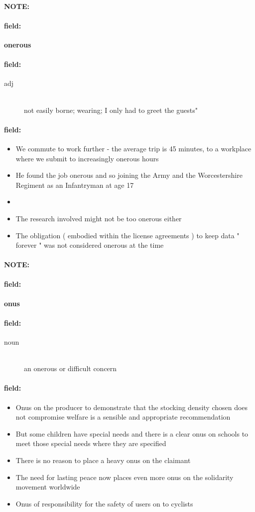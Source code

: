 \documentclass[12pt]{article}
\newenvironment{note}{\paragraph{NOTE:}}{}
\newenvironment{field}{\paragraph{field:}}{}
\begin{document}
\begin{note}
\begin{field}
\textbf{\large onerous}
\end{field}


\begin{field}
\begin{description}
\item[adj] \hfill \\ 
not easily borne; wearing; I only had to greet the guests"

\end{description}
\end{field}

\begin{field}
\begin{itemize}
\item We commute to work further - the average trip is 45 minutes, to a workplace where we submit to increasingly onerous hours
\item He found the job onerous and so joining the Army and the Worcestershire Regiment as an Infantryman at age 17
\item 
\item The research involved might not be too onerous either
\item The obligation ( embodied within the license agreements ) to keep data " forever " was not considered onerous at the time
\end{itemize}
\end{field}
\end{note}
\begin{note}
\begin{field}
\textbf{\large onus}
\end{field}


\begin{field}
\begin{description}
\item[noun] \hfill \\ 
an onerous or difficult concern

\end{description}
\end{field}

\begin{field}
\begin{itemize}
\item Onus on the producer to demonstrate that the stocking density chosen does not compromise welfare is a sensible and appropriate recommendation
\item But some children have special needs and there is a clear onus on schools to meet those special needs where they are specified
\item There is no reason to place a heavy onus on the claimant
\item The need for lasting peace now places even more onus on the solidarity movement worldwide
\item Onus of responsibility for the safety of users on to cyclists
\end{itemize}
\end{field}
\end{note}
\end{document}
